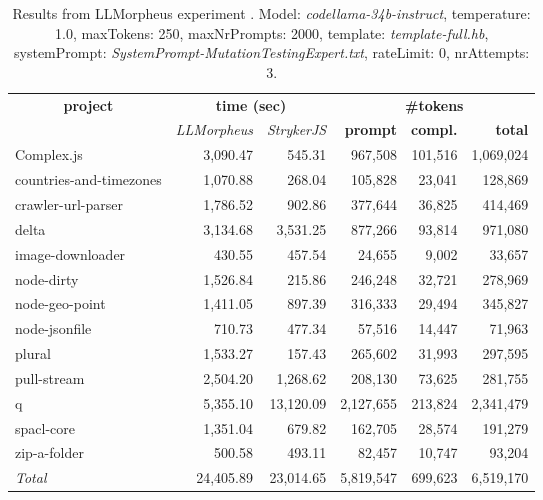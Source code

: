 
\begin{table*}[hbt!]
\centering
{\scriptsize
\begin{tabular}{l||r|r|r|r|r}
\multicolumn{1}{c|}{\bf project} & \multicolumn{2}{|c|}{\bf time (sec)} & \multicolumn{3}{|c|}{\bf \#tokens} \\
               & {\it LLMorpheus} & {\it StrykerJS} & {\bf prompt} & {\bf compl.} & {\bf total} \\
\hline
  Complex.js & 3,090.47 & 545.31 & 967,508 & 101,516 & 1,069,024 \\ 
countries-and-timezones & 1,070.88 & 268.04 & 105,828 & 23,041 & 128,869 \\ 
crawler-url-parser & 1,786.52 & 902.86 & 377,644 & 36,825 & 414,469 \\ 
delta & 3,134.68 & 3,531.25 & 877,266 & 93,814 & 971,080 \\ 
image-downloader & 430.55 & 457.54 & 24,655 & 9,002 & 33,657 \\ 
node-dirty & 1,526.84 & 215.86 & 246,248 & 32,721 & 278,969 \\ 
node-geo-point & 1,411.05 & 897.39 & 316,333 & 29,494 & 345,827 \\ 
node-jsonfile & 710.73 & 477.34 & 57,516 & 14,447 & 71,963 \\ 
plural & 1,533.27 & 157.43 & 265,602 & 31,993 & 297,595 \\ 
pull-stream & 2,504.20 & 1,268.62 & 208,130 & 73,625 & 281,755 \\ 
q & 5,355.10 & 13,120.09 & 2,127,655 & 213,824 & 2,341,479 \\ 
spacl-core & 1,351.04 & 679.82 & 162,705 & 28,574 & 191,279 \\ 
zip-a-folder & 500.58 & 493.11 & 82,457 & 10,747 & 93,204 \\ 
\hline
  \textit{Total} & 24,405.89 & 23,014.65 & 5,819,547 & 699,623 & 6,519,170 \\
  \end{tabular}
  }
  \\[2mm]
  \caption{Results from LLMorpheus experiment .
    Model: \textit{codellama-34b-instruct}, 
    temperature: 1.0, 
    maxTokens: 250, 
    maxNrPrompts: 2000, 
    template: \textit{template-full.hb}, 
    systemPrompt: \textit{SystemPrompt-MutationTestingExpert.txt}, 
    rateLimit: 0, 
    nrAttempts: 3.  
  }
  \label{table:Cost:run341:codellama-34b-instruct:template-full.hb:1.0}
\end{table*}